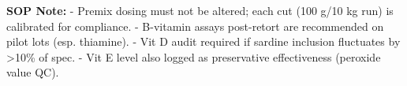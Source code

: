 \textbf{SOP Note:}  
- Premix dosing must not be altered; each cut (100 g/10 kg run) is calibrated for compliance.  
- B-vitamin assays post-retort are recommended on pilot lots (esp. thiamine).  
- Vit D audit required if sardine inclusion fluctuates by >10\% of spec.  
- Vit E level also logged as preservative effectiveness (peroxide value QC).  
